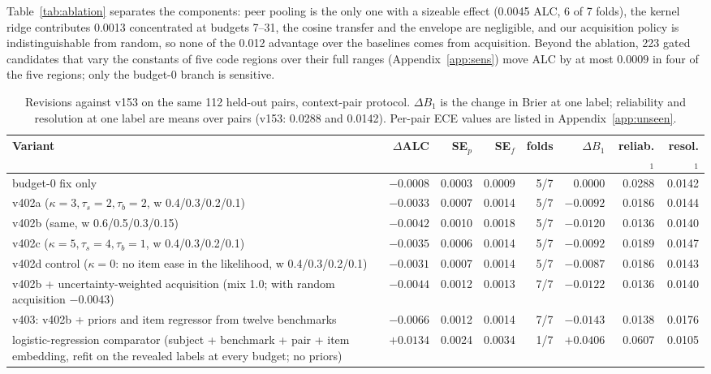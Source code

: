 \documentclass{article}
\begin{document}
Table~\ref{tab:ablation} separates the components: peer pooling is the only one with a sizeable effect (0.0045 ALC, 6 of 7 folds), the kernel ridge contributes 0.0013 concentrated at budgets 7--31, the cosine transfer and the envelope are negligible, and our acquisition policy is indistinguishable from random, so none of the 0.012 advantage over the baselines comes from acquisition. Beyond the ablation, 223 gated candidates that vary the constants of five code regions over their full ranges (Appendix~\ref{app:sens}) move ALC by at most $0.0009$ in four of the five regions; only the budget-0 branch is sensitive.

\begin{table}[t]
\caption{Revisions against v153 on the same 112 held-out pairs, context-pair protocol. $\Delta B_1$ is the change in Brier at one label; reliability and resolution at one label are means over pairs (v153: 0.0288 and 0.0142). Per-pair ECE values are listed in Appendix~\ref{app:unseen}.}
\label{tab:v402}
\centering\small
\begin{tabular}{lrrrrrrr}
\toprule
Variant & $\Delta$ALC & SE$_p$ & SE$_f$ & folds & $\Delta B_1$ & reliab.$_1$ & resol.$_1$ \\
\midrule
budget-0 fix only & $-0.0008$ & 0.0003 & 0.0009 & 5/7 & $0.0000$ & 0.0288 & 0.0142 \\
v402a ($\kappa{=}3,\tau_s{=}2,\tau_b{=}2$, w 0.4/0.3/0.2/0.1) & $-0.0033$ & 0.0007 & 0.0014 & 5/7 & $-0.0092$ & 0.0186 & 0.0144 \\
v402b (same, w 0.6/0.5/0.3/0.15) & $-0.0042$ & 0.0010 & 0.0018 & 5/7 & $-0.0120$ & 0.0136 & 0.0140 \\
v402c ($\kappa{=}5,\tau_s{=}4,\tau_b{=}1$, w 0.4/0.3/0.2/0.1) & $-0.0035$ & 0.0006 & 0.0014 & 5/7 & $-0.0092$ & 0.0189 & 0.0147 \\
v402d control ($\kappa{=}0$: no item ease in the likelihood, w 0.4/0.3/0.2/0.1) & $-0.0031$ & 0.0007 & 0.0014 & 5/7 & $-0.0087$ & 0.0186 & 0.0143 \\
v402b + uncertainty-weighted acquisition (mix 1.0; with random acquisition $-0.0043$) & $-0.0044$ & 0.0012 & 0.0013 & 7/7 & $-0.0122$ & 0.0136 & 0.0140 \\
v403: v402b + priors and item regressor from twelve benchmarks & $\mathbf{-0.0066}$ & 0.0012 & 0.0014 & 7/7 & $-0.0143$ & 0.0138 & 0.0176 \\
\midrule
logistic-regression comparator (subject + benchmark + pair + item embedding, refit on the revealed labels at every budget; no priors) & $+0.0134$ & 0.0024 & 0.0034 & 1/7 & $+0.0406$ & 0.0607 & 0.0105 \\
\bottomrule
\end{tabular}
\end{table}
\end{document}
